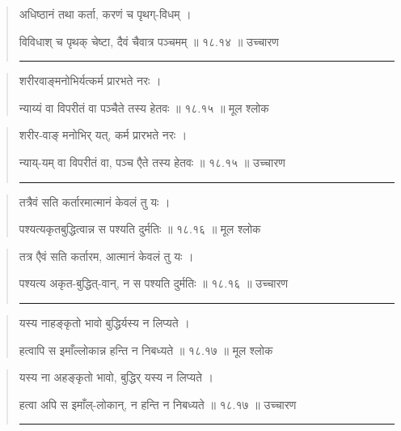 \begin{quotation}

अधिष्ठानं तथा कर्ता, करणं च पृथग्-विधम्‌  ।  

विविधाश् च पृथक् चेष्टा, दैवं चैवात्र पञ्चमम्‌  ॥ १८.१४ ॥  उच्चारण

\noindent\rule{16cm}{0.4pt} 
\end{quotation}


\begin{quotation}

शरीरवाङ्‍मनोभिर्यत्कर्म प्रारभते नरः  ।  

न्याय्यं वा विपरीतं वा पञ्चैते तस्य हेतवः  ॥ १८.१५ ॥  मूल श्लोक
\end{quotation}

\begin{quotation}

शरीर-वाङ्‍ मनोभिर् यत्, कर्म प्रारभते नरः  ।  

न्याय्-यम् वा विपरीतं वा, पञ्च एैते तस्य हेतवः  ॥ १८.१५ ॥  उच्चारण

\noindent\rule{16cm}{0.4pt} 
\end{quotation}


\begin{quotation}

तत्रैवं सति कर्तारमात्मानं केवलं तु यः  ।  

पश्यत्यकृतबुद्धित्वान्न स पश्यति दुर्मतिः  ॥ १८.१६ ॥  मूल श्लोक
\end{quotation}

\begin{quotation}

तत्र एैवं सति कर्तारम, आत्मानं केवलं तु यः  ।  

पश्यत्य अकृत-बुद्धित्-वान्, न स पश्यति दुर्मतिः  ॥ १८.१६ ॥  उच्चारण

\noindent\rule{16cm}{0.4pt} 
\end{quotation}


\begin{quotation}

यस्य नाहङ्‍कृतो भावो बुद्धिर्यस्य न लिप्यते  ।  

हत्वापि स इमाँल्लोकान्न हन्ति न निबध्यते  ॥ १८.१७ ॥  मूल श्लोक
\end{quotation}

\begin{quotation}
यस्य ना अहङ्‍कृतो भावो, बुद्धिर् यस्य न लिप्यते  ।  

हत्वा अपि स इमाँल्-लोकान्, न हन्ति न निबध्यते  ॥ १८.१७ ॥  उच्चारण

\noindent\rule{16cm}{0.4pt} 
\end{quotation}



